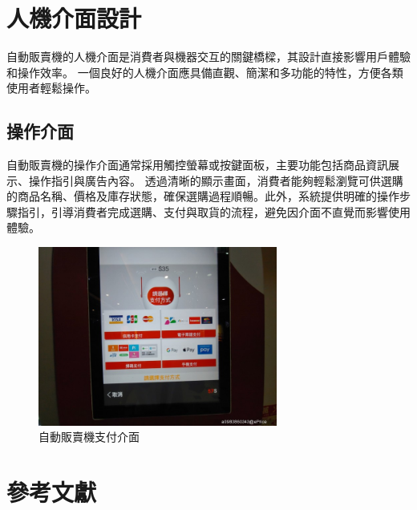 \documentclass[12pt]{article}       %
\begin{document}
\section{\centering 人機介面設計}
\hspace{2em}
自動販賣機的人機介面是消費者與機器交互的關鍵橋樑，其設計直接影響用戶體驗和操作效率。
一個良好的人機介面應具備直觀、簡潔和多功能的特性，方便各類使用者輕鬆操作。

\subsection{操作介面} 
\hspace{2em}
自動販賣機的操作介面通常採用觸控螢幕或按鍵面板，主要功能包括商品資訊展示、操作指引與廣告內容。
透過清晰的顯示畫面，消費者能夠輕鬆瀏覽可供選購的商品名稱、價格及庫存狀態，確保選購過程順暢。此外，系統提供明確的操作步驟指引，引導消費者完成選購、支付與取貨的流程，避免因介面不直覺而影響使用體驗。
\begin{figure}[H]
    \centering
    \includegraphics[width=0.7\textwidth]{a0983860343_2_e7743433e8979865768e7468e82e8519.jpg}     %
    \caption{自動販賣機支付介面\cite{eprice_cashless_vending_machine_2025}}    %
    \label{fig:example4}    %
\end{figure} 

\section{\centering 參考文獻}
\vspace{-3.5em}  %
\renewcommand{\refname}{}  %
\printbibliography  %
\end{document}
